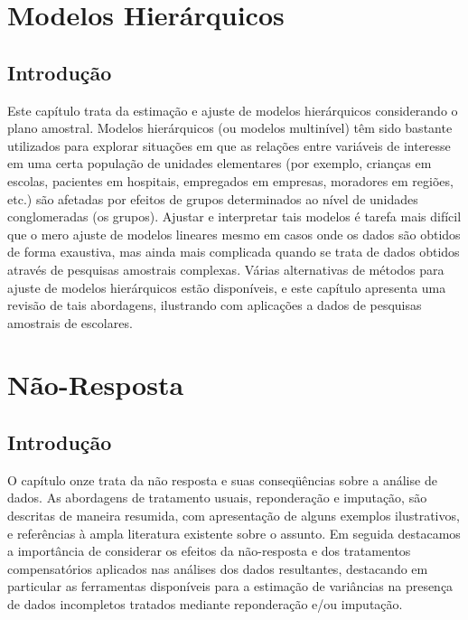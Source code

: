 \documentclass[]{book}
\numberwithin{example}{chapter}
\numberwithin{remark}{chapter}
\numberwithin{definition}{chapter}
\begin{document}
\chapter{Modelos Hierárquicos}\label{modelos-hierarquicos}

\section{Introdução}\label{introducao-4}

Este capítulo trata da estimação e ajuste de modelos hierárquicos
considerando o plano amostral. Modelos hierárquicos (ou modelos
multinível) têm sido bastante utilizados para explorar situações em que
as relações entre variáveis de interesse em uma certa população de
unidades elementares (por exemplo, crianças em escolas, pacientes em
hospitais, empregados em empresas, moradores em regiões, etc.) são
afetadas por efeitos de grupos determinados ao nível de unidades
conglomeradas (os grupos). Ajustar e interpretar tais modelos é tarefa
mais difícil que o mero ajuste de modelos lineares mesmo em casos onde
os dados são obtidos de forma exaustiva, mas ainda mais complicada
quando se trata de dados obtidos através de pesquisas amostrais
complexas. Várias alternativas de métodos para ajuste de modelos
hierárquicos estão disponíveis, e este capítulo apresenta uma revisão de
tais abordagens, ilustrando com aplicações a dados de pesquisas
amostrais de escolares.

\chapter{Não-Resposta}\label{nao-resposta}

\section{Introdução}\label{introducao-5}

O capítulo onze trata da não resposta e suas conseqüências sobre a
análise de dados. As abordagens de tratamento usuais, reponderação e
imputação, são descritas de maneira resumida, com apresentação de alguns
exemplos ilustrativos, e referências à ampla literatura existente sobre
o assunto. Em seguida destacamos a importância de considerar os efeitos
da não-resposta e dos tratamentos compensatórios aplicados nas análises
dos dados resultantes, destacando em particular as ferramentas
disponíveis para a estimação de variâncias na presença de dados
incompletos tratados mediante reponderação e/ou imputação.
\end{document}

